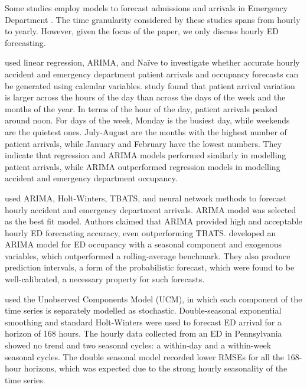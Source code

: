 \documentclass[]{elsarticle} %
\begin{document}
Some studies employ models to forecast admissions and arrivals in Emergency Department \citep{gul2020exhaustive}. The time granularity considered by these studies spans from hourly to yearly. However, given the focus of the paper, we only discuss hourly ED forecasting.

\citet{hertzum2017forecasting} used linear regression, ARIMA, and Naïve to investigate whether accurate hourly accident and emergency department patient arrivals and occupancy forecasts can be generated using calendar variables. \citet{hertzum2017forecasting} study found that patient arrival variation is larger across the hours of the day than across the days of the week and the months of the year. In terms of the hour of the day, patient arrivals peaked around noon. For days of the week, Monday is the busiest day, while weekends are the quietest ones. July-August are the months with the highest number of patient arrivals, while January and February have the lowest numbers. They indicate that regression and ARIMA models performed similarly in modelling patient arrivals, while ARIMA outperformed regression models in modelling accident and emergency department occupancy.

\citet{choudhury2020forecasting} used ARIMA, Holt-Winters, TBATS, and neural network methods to forecast hourly accident and emergency department arrivals. ARIMA model was selected as the best fit model. Authors claimed that ARIMA provided high and acceptable hourly ED forecasting accuracy, even outperforming TBATS. \citet{Cheng2021} developed an ARIMA model for ED occupancy with a seasonal component and exogenous variables, which outperformed a rolling-average benchmark. They also produce prediction intervals, a form of the probabilistic forecast, which were found to be well-calibrated, a necessary property for such forecasts.

\citet{morzuch2006forecasting} used the Unobserved Components Model (UCM), in which each component of the time series is separately modelled as stochastic. Double-seasonal exponential smoothing and standard Holt-Winters were used to forecast ED arrival for a horizon of 168 hours. The hourly data collected from an ED in Pennsylvania showed no trend and two seasonal cycles: a within-day and a within-week seasonal cycles. The double seasonal model recorded lower RMSEs for all the 168-hour horizons, which was expected due to the strong hourly seasonality of the time series.
\end{document}
